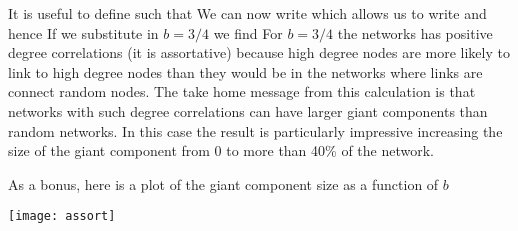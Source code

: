   It is useful to define 
 such that 
 We can now write 
 which allows us to write 
 and hence 
 If we substitute in $b=3/4$ we find 
 For $b=3/4$ the networks has positive degree correlations (it is assortative) because high degree nodes are more likely to link to high degree nodes than they would be in the networks where links are connect random nodes. The take home message from this calculation is that networks with such degree correlations can have larger giant components than random networks. In this case the result is particularly impressive increasing the size of the giant component from 0 to more than 40\% of the network. 
 
 As a bonus, here is a plot of the giant component size as a function of $b$
 \begin{center}
 \texttt{[image: assort]}     
 \end{center}
\solutionend